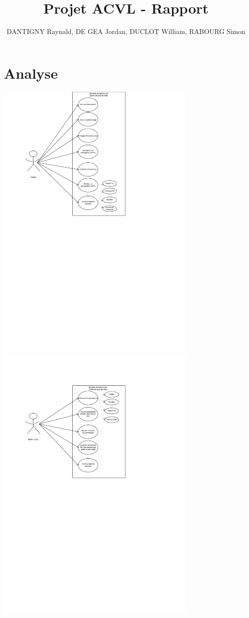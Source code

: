\documentclass[a4paper,oneside,10pt]{article}
\title{Projet ACVL - Rapport}
\author{DANTIGNY Raynald, DE GEA Jordan, DUCLOT William, RABOURG Simon}
\begin{document}
\maketitle

\section{Analyse}

\includegraphics[width=10cm]{images/utilisation/cas1.pdf} 
\includegraphics[width=10cm]{images/utilisation/cas2.pdf}
\end{document}
